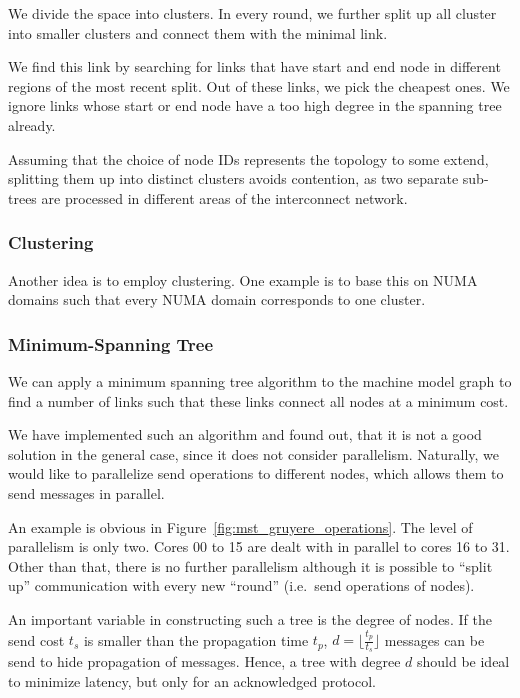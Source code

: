 \documentclass{article}
\begin{document}
We divide the space into clusters. In every round, we further split up
all cluster into smaller clusters and connect them with the minimal
link. 

We find this link by searching for links that have start and
end node in different regions of the most recent split. Out of these
links, we pick the cheapest ones. We ignore links whose start or end
node have a too high degree in the spanning tree already.

Assuming that the choice of node IDs represents the topology to some
extend, splitting them up into distinct clusters avoids contention, as
two separate sub-trees are processed in different areas of the
interconnect network.

\subsubsection{Clustering}

Another idea is to employ clustering. One example is to base this on
NUMA domains such that every NUMA domain corresponds to one cluster. 

\subsubsection{Minimum-Spanning Tree}

We can apply a minimum spanning tree algorithm to the machine model
graph to find a number of links such that these links connect all
nodes at a minimum cost.

We have implemented such an algorithm and found out, that it is not a
good solution in the general case, since it does not consider
parallelism. Naturally, we would like to parallelize send operations
to different nodes, which allows them to send messages in parallel. 

An example is obvious in Figure~\ref{fig:mst_gruyere_operations}. The
level of parallelism is only two. Cores 00 to 15 are dealt with in
parallel to cores 16 to 31. Other than that, there is no further
parallelism although it is possible to ``split up'' communication with
every new ``round'' (i.e.\ send operations of nodes).

An important variable in constructing such a tree is the degree of
nodes. If the send cost $t_s$ is smaller than the propagation time
$t_p$,  $d = \lfloor \frac{t_p}{t_s} \rfloor$ messages can be send to
hide propagation of messages. Hence, a tree with degree $d$ should be
ideal to minimize latency, but only for an acknowledged protocol.
\end{document}
